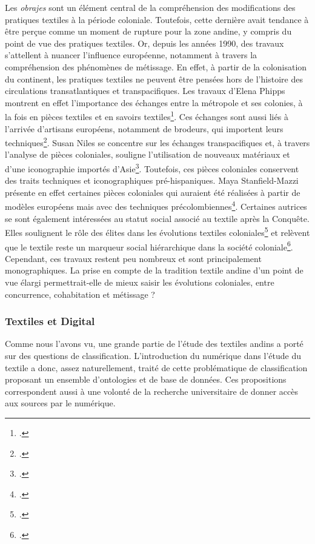Les \textit{obrajes} sont un élément central de la compréhension des modifications des pratiques textiles à la période coloniale. Toutefois, cette dernière avait tendance à être perçue comme un moment de rupture pour la zone andine, y compris du point de vue des pratiques textiles. Or, depuis les années 1990, des travaux s'attellent à nuancer l'influence européenne, notamment à travers la compréhension des phénomènes de métissage. En effet, à partir de la colonisation du continent, les pratiques textiles ne peuvent être pensées hors de l'histoire des circulations transatlantiques et transpacifiques. Les travaux d'Elena Phipps montrent en effet l'importance des échanges entre la métropole et ses colonies, à la fois en pièces textiles et en savoirs textiles\footcite{phippsIberianGlobe2013}. Ces échanges sont aussi liés à l'arrivée d'artisans européens, notamment de brodeurs, qui importent leurs techniques\footcite[p.~36]{phippsIberianGlobe2013}. Susan Niles se concentre sur les échanges transpacifiques et, à travers l'analyse de pièces coloniales, souligne l'utilisation de nouveaux matériaux et d'une iconographie importés d'Asie\footcite[(p.~60)]{nilesArtistEmpireInca1994}. Toutefois, ces pièces coloniales conservent des traits techniques et iconographiques pré-hispaniques. Maya Stanfield-Mazzi présente en effet certaines pièces coloniales qui auraient été réalisées à partir de modèles européens mais avec des techniques précolombiennes\footcite{stanfield-mazziCreatividadArteAndino2020}. Certaines autrices se sont également intéressées au statut social associé au textile après la Conquête. Elles soulignent le rôle des élites dans les évolutions textiles coloniales\footcite{solorzanogonzalesTapizAndinoNobleza2020} et relèvent que le textile reste un marqueur social hiérarchique dans la société coloniale\footcite{ramosTejidosSociedadColonial2010}. Cependant, ces travaux restent peu nombreux et sont principalement monographiques. La prise en compte de la tradition textile andine d'un point de vue élargi permettrait-elle de mieux saisir les évolutions coloniales, entre concurrence, cohabitation et métissage ?


\subsubsection*{Textiles et Digital}

Comme nous l'avons vu, une grande partie de l'étude des textiles andins a porté sur des questions de classification. L'introduction du numérique dans l'étude du textile a donc, assez naturellement, traité de cette problématique de classification proposant un ensemble d'ontologies et de base de données. Ces propositions correspondent aussi à une volonté de la recherche universitaire de donner accès aux sources par le numérique.\\

